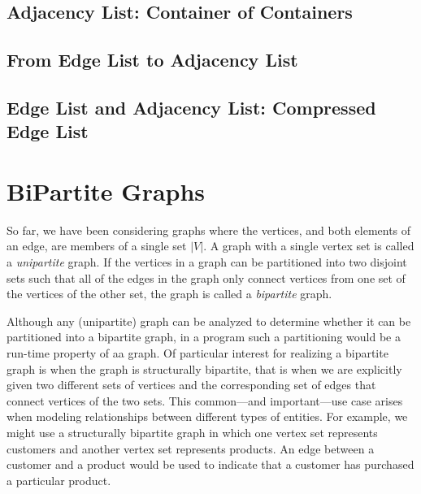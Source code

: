 

\subsection{Adjacency List: Container of Containers}



\subsection{From Edge List to Adjacency List}


\subsection{Edge List and Adjacency List: Compressed Edge List}



\section{BiPartite Graphs}

So far, we have been considering graphs where the vertices, and both elements of an
edge, are members of a single set $|V|$.  A graph with a single vertex set is called a
\emph{unipartite} graph.  If the vertices in a graph can be partitioned into two
disjoint sets such that all of the edges in the graph only connect vertices from one
set of the vertices of the other set, the graph is called a \emph{bipartite} graph.

Although any (unipartite) graph can be analyzed to determine whether it can be partitioned into a bipartite graph, 
in a program such a partitioning would be a run-time property of aa graph.  Of particular interest for realizing a bipartite graph is when the graph is structurally bipartite, that is when we are explicitly given two different sets of vertices and the corresponding set of edges that connect vertices of the two sets.  This common---and important---use case arises when modeling relationships between different types of entities.  For example, we might use a structurally bipartite graph in which one vertex set represents customers and another vertex set represents products.  An edge between a customer and a product would be used to indicate that a customer has purchased a particular product.

